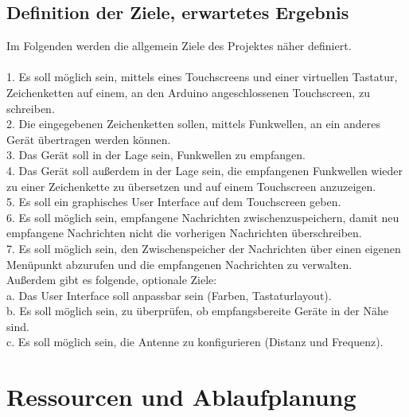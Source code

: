 \documentclass[a4paper, 11pt]{scrartcl}
\begin{document}
\subsection{Definition der Ziele, erwartetes Ergebnis}\label{ch:goals}
Im Folgenden werden die allgemein Ziele des Projektes näher definiert.
\\
\\
1. Es soll möglich sein, mittels eines Touchscreens und einer virtuellen Tastatur, Zeichenketten auf einem, an den Arduino angeschlossenen Touchscreen, zu schreiben.
\\
2. Die eingegebenen Zeichenketten sollen, mittels Funkwellen, an ein anderes Gerät übertragen werden können.
\\
3. Das Gerät soll in der Lage sein, Funkwellen zu empfangen.
\\
4. Das Gerät soll außerdem in der Lage sein, die empfangenen Funkwellen wieder zu einer Zeichenkette zu übersetzen und auf einem Touchscreen anzuzeigen.
\\
5. Es soll ein graphisches User Interface auf dem Touchscreen geben.
\\
6. Es soll möglich sein, empfangene Nachrichten zwischenzuspeichern, damit neu empfangene Nachrichten nicht die vorherigen Nachrichten überschreiben.
\\
7. Es soll möglich sein, den Zwischenspeicher der Nachrichten über einen eigenen Menüpunkt abzurufen und die empfangenen Nachrichten zu verwalten.
\\
Außerdem gibt es folgende, optionale Ziele:
\\
a. Das User Interface soll anpassbar sein (Farben, Tastaturlayout).
\\
b. Es soll möglich sein, zu überprüfen, ob empfangsbereite Geräte in der Nähe sind.
\\
c. Es soll möglich sein, die Antenne zu konfigurieren (Distanz und Frequenz).


\section{Ressourcen und Ablaufplanung}
\end{document}
